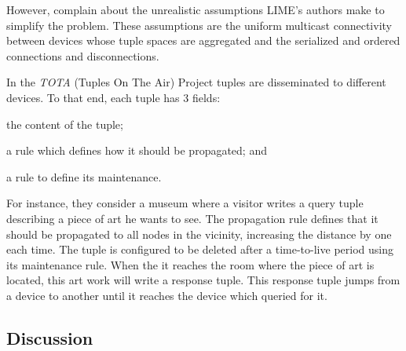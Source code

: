 However, \citet{coulouris_distributed_2012} complain about the unrealistic assumptions LIME's authors make to simplify the problem. %
These assumptions are the uniform multicast connectivity between devices whose tuple spaces are aggregated and the serialized and ordered connections and disconnections.


In the \emph{TOTA} (Tuples On The Air) Project \citep{mamei_programming_2009} tuples are disseminated to different devices.
To that end, each tuple has 3 fields:
\begin{enumerate*}[label=\itshape(\arabic*\upshape)]
  \item the content of the tuple;
  \item a rule which defines how it should be propagated; and
  \item a rule to define its maintenance.
\end{enumerate*}

For instance, they consider a museum where a visitor writes a query tuple describing a piece of art he wants to see.
The propagation rule defines that it should be propagated to all nodes in the vicinity, increasing the distance by one each time.
The tuple is configured to be deleted after a time-to-live period using its maintenance rule.
When the it reaches the room where the piece of art is located, this art work will write a response tuple.
This response tuple jumps from a device to another until it reaches the device which queried for it.






\subsection{Discussion}

